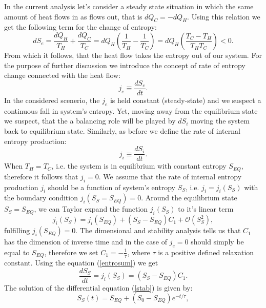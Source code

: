 \documentclass[a4paper,12pt]{article}
\begin{document}
In the current analysis let's consider a steady state situation in which the same amount of heat flows in as flows out, that is $dQ_C=-dQ_H$. Using this relation we get the following term for the change of entropy:
\begin{equation}
dS_e=\frac{dQ_H}{T_H}+\frac{dQ_C}{T_C}=dQ_H\left(\frac{1}{T_H}-\frac{1}{T_C}\right)
=dQ_H\left(\frac{T_C-T_H}{T_HT_C}\right)<0.
\label{dSe1}
\end{equation}
From which it follows, that the heat flow takes the entropy out of our system.
For the purpose of further discussion we introduce the concept of rate of entropy change connected with the heat flow:
\begin{equation}
j_e \equiv  \frac{dS_e}{dt}. 
\end{equation}
In the considered scenerio, the $j_e$ is held constant (steady-state) and we suspect a continuous fall in system's entropy. Yet, moving away from the equilibrium state we suspect, that the a balancing role will be played by $dS_i$ moving the system back to equilibrium state. Similarly, as before we define the rate of internal entropy production:
\begin{equation}
j_i \equiv \frac{dS_i}{dt}.   
\end{equation} 
When $T_H=T_C$, i.e. the system is in equilibrium with constant entropy $S_{EQ}$, therefore it follows that $j_i=0$.
We assume that the rate of internal entropy production $j_i$ should be a function  of system's entropy $S_S$, i.e. $j_i = j_i(S_S)$ with the boundary condition $j_i(S_S=S_{EQ})=0$. Around the equilibrium state $S_S=S_{EQ}$, we can Taylor expand the function $j_i(S_S)$ to it's linear term
\begin{equation}
j_i(S_S)=j_i\left(S_{EQ}\right)+\left(S_S-S_{EQ}\right)C_1+\mathcal{O}\left(S_S^2\right),
\end{equation} 
fulfilling $j_i\left(S_{EQ}\right)=0$. The dimensional and stability analysis tells us that $C_1$ has the dimension of inverse time and in the case of 
$j_e=0$ should simply be equal to $S_{EQ}$, therefore we set $C_1 = -\frac{1}{\tau}$, where $\tau$ is a positive defined relaxation constant. Using the equation (\ref{entrosum}) we get
\begin{equation}
\label{stab}
\frac{dS_S}{dt}=j_i\left(S_S\right)=\left(S_S-S_{EQ}\right)C_1.
\end{equation} 
The solution of the differential equation (\ref{stab}) is given by:
\begin{equation}
S_S(t) =S_{EQ}+(S_0-S_{EQ})e^{-t/\tau}, 
\end{equation}
\end{document}
